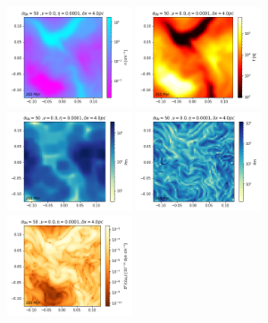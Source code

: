 \documentclass[preprint2]{aastex63}
\begin{document}

\begin{figure}
\centering
\includegraphics[trim=0.0cm 0.00cm 0.0cm 0.0cm,clip=true,width=0.33\textwidth]{csc_figs/rho4pcPm0e-4_032.png}
\includegraphics[trim=0.0cm 0.00cm 0.0cm 0.0cm,clip=true,width=0.33\textwidth]{csc_figs/tt4pcPm0e-4_032.png}
\includegraphics[trim=0.0cm 0.00cm 0.0cm 0.0cm,clip=true,width=0.33\textwidth]{csc_figs/Pm4pcPm0e-4_032.png}
\includegraphics[trim=0.0cm 0.00cm 0.0cm 0.0cm,clip=true,width=0.33\textwidth]{csc_figs/Rm4pcPm0e-4_032.png}
\includegraphics[trim=0.0cm 0.00cm 0.0cm 0.0cm,clip=true,width=0.33\textwidth]{csc_figs/pb4pcPm0e-4_032.png}

\end{figure}
\end{document}
